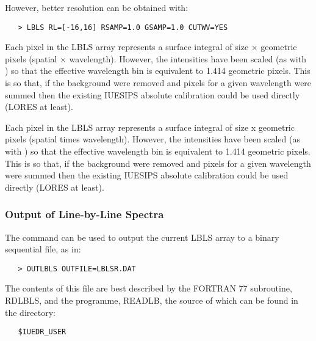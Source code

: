 However, better resolution can be obtained with:

\begin{verbatim}
   > LBLS RL=[-16,16] RSAMP=1.0 GSAMP=1.0 CUTWV=YES
\end{verbatim}

\begin{latexonly}
Each pixel in the LBLS array represents a surface integral of size
 $\times$ 
geometric pixels (spatial $\times$ wavelength)\@.  However, the intensities
have been scaled (as with ) so that the
effective wavelength bin is equivalent to 1.414 geometric pixels.
This is so that, if the background were removed and pixels for a given
wavelength were summed then the existing IUESIPS absolute calibration could
be used directly (LORES at least).
\end{latexonly}

\begin{htmlonly}
Each pixel in the LBLS array represents a surface integral of size
x
geometric pixels (spatial times wavelength)\@.  However, the intensities
have been scaled (as with ) so that the
effective wavelength bin is equivalent to 1.414 geometric pixels.
This is so that, if the background were removed and pixels for a given
wavelength were summed then the existing IUESIPS absolute calibration could
be used directly (LORES at least).
\end{htmlonly}

\subsubsection{Output of Line-by-Line Spectra}

The 
 command can be used to output the current LBLS array to a
binary sequential file, as in:

\begin{verbatim}
   > OUTLBLS OUTFILE=LBLSR.DAT
\end{verbatim}

The contents of this file are best described by the FORTRAN 77 subroutine,
RDLBLS, and the programme, READLB, the source of which can be found in the
directory:

\begin{verbatim}
   $IUEDR_USER
\end{verbatim}

